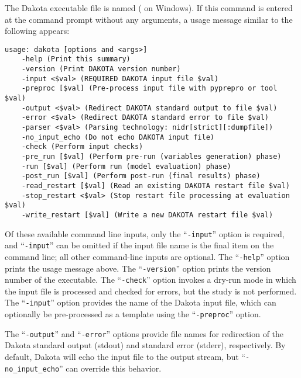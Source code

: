 The Dakota executable file is named  ( on
Windows). If this command is entered at the command prompt without any
arguments, a usage message similar to the following appears:
\begin{small}
\begin{verbatim}
usage: dakota [options and <args>]
	-help (Print this summary)
	-version (Print DAKOTA version number)
	-input <$val> (REQUIRED DAKOTA input file $val)
	-preproc [$val] (Pre-process input file with pyprepro or tool $val)
	-output <$val> (Redirect DAKOTA standard output to file $val)
	-error <$val> (Redirect DAKOTA standard error to file $val)
	-parser <$val> (Parsing technology: nidr[strict][:dumpfile])
	-no_input_echo (Do not echo DAKOTA input file)
	-check (Perform input checks)
	-pre_run [$val] (Perform pre-run (variables generation) phase)
	-run [$val] (Perform run (model evaluation) phase)
	-post_run [$val] (Perform post-run (final results) phase)
	-read_restart [$val] (Read an existing DAKOTA restart file $val)
	-stop_restart <$val> (Stop restart file processing at evaluation $val)
	-write_restart [$val] (Write a new DAKOTA restart file $val)
\end{verbatim}
\end{small}

Of these available command line inputs, only the ``\texttt{-input}''
option is required, and ``\texttt{-input}'' can be omitted if the
input file name is the final item on the command line; all other
command-line inputs are optional. The ``\texttt{-help}'' option prints
the usage message above. The ``\texttt{-version}'' option prints the
version number of the executable. The ``\texttt{-check}'' option
invokes a dry-run mode in which the input file is processed and
checked for errors, but the study is not performed. The
``\texttt{-input}'' option provides the name of the Dakota input file,
which can optionally be pre-processed as a template using the
``\texttt{-preproc}'' option.

The ``\texttt{-output}'' and ``\texttt{-error}'' options provide file
names for redirection of the Dakota standard output (stdout) and
standard error (stderr), respectively. By default, Dakota will echo
the input file to the output stream, but ``\texttt{-no\_input\_echo}''
can override this behavior.

